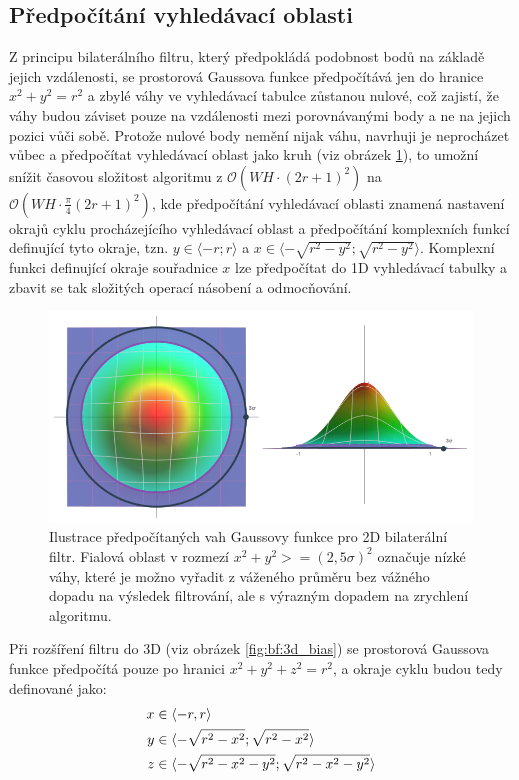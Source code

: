 \subsection*{Předpočítání vyhledávací oblasti}
\label{subsec:bf:precomupte_bias}
Z principu bilaterálního filtru, který předpokládá podobnost bodů na základě jejich vzdálenosti, se prostorová Gaussova funkce předpočítává jen do hranice $x^2+y^2=r^2$ a zbylé váhy ve vyhledávací tabulce zůstanou nulové, což zajistí, že váhy budou záviset pouze na vzdálenosti mezi porovnávanými body a ne na jejich pozici vůči sobě. Protože nulové body nemění nijak váhu, navrhuji je neprocházet vůbec a předpočítat vyhledávací oblast jako kruh (viz obrázek \ref{fig:bf:3d_gauss_bias}), to umožní snížit časovou složitost algoritmu z $\mathcal{O}(WH\cdot(2r+1)^2)$ na $\mathcal{O}(WH\cdot\frac{\pi}{4}(2r+1)^2)$, kde předpočítání vyhledávací oblasti znamená nastavení okrajů cyklu procházejícího vyhledávací oblast a předpočítání komplexních funkcí definující tyto okraje, tzn. $y \in \langle-r;r\rangle$ a $x \in \langle-\sqrt{r^2 - y^2};\sqrt{r^2 - y^2}\rangle$. Komplexní funkci definující okraje souřadnice $x$ lze předpočítat do 1D vyhledávací tabulky a zbavit se tak složitých operací násobení a odmocňování.

\begin{figure} [H]
    \centering
    \label{fig:bf:3d_gauss_bias}
    \includegraphics[width=1\textwidth]{figures/bf-3d-gauss-2.png}
    \caption{Ilustrace předpočítaných vah Gaussovy funkce pro 2D bilaterální filtr. Fialová oblast v rozmezí $x^2+y^2>=(2,5\sigma)^2$ označuje nízké váhy, které je možno vyřadit z váženého průměru bez vážného dopadu na výsledek filtrování, ale s výrazným dopadem na zrychlení algoritmu.}
\end{figure}

Při rozšíření filtru do 3D  (viz obrázek \ref{fig:bf:3d_bias}) se prostorová Gaussova funkce předpočítá pouze po hranici $x^2+y^2+z^2=r^2$, a okraje cyklu budou tedy definované jako:
\begin{align*}
    \centering
    x & \in \langle-r,r\rangle \\
    y & \in \langle-\sqrt{r^2-x^2};\sqrt{r^2-x^2}\rangle \\
    z & \in \langle-\sqrt{r^2-x^2-y^2};\sqrt{r^2-x^2-y^2}\rangle
\end{align*}

